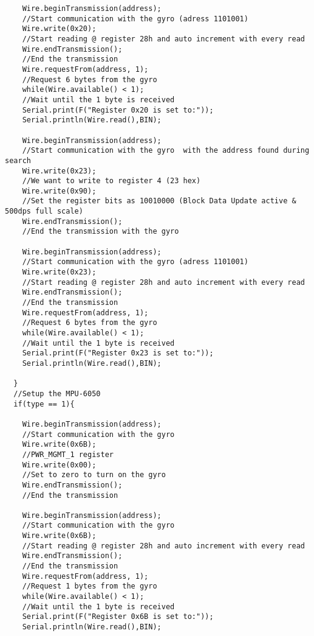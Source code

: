 \begin{lstlisting}
    Wire.beginTransmission(address);                             
    //Start communication with the gyro (adress 1101001)
    Wire.write(0x20);                                            
    //Start reading @ register 28h and auto increment with every read
    Wire.endTransmission();                                      
    //End the transmission
    Wire.requestFrom(address, 1);                                
    //Request 6 bytes from the gyro
    while(Wire.available() < 1);                                 
    //Wait until the 1 byte is received
    Serial.print(F("Register 0x20 is set to:"));
    Serial.println(Wire.read(),BIN);

    Wire.beginTransmission(address);                             
    //Start communication with the gyro  with the address found during search
    Wire.write(0x23);                                            
    //We want to write to register 4 (23 hex)
    Wire.write(0x90);                                            
    //Set the register bits as 10010000 (Block Data Update active & 500dps full scale)
    Wire.endTransmission();                                      
    //End the transmission with the gyro
    
    Wire.beginTransmission(address);                             
    //Start communication with the gyro (adress 1101001)
    Wire.write(0x23);                                            
    //Start reading @ register 28h and auto increment with every read
    Wire.endTransmission();                                      
    //End the transmission
    Wire.requestFrom(address, 1);                               
    //Request 6 bytes from the gyro
    while(Wire.available() < 1);                                 
    //Wait until the 1 byte is received
    Serial.print(F("Register 0x23 is set to:"));
    Serial.println(Wire.read(),BIN);

  }
  //Setup the MPU-6050
  if(type == 1){
    
    Wire.beginTransmission(address);                             
    //Start communication with the gyro
    Wire.write(0x6B);                                            
    //PWR_MGMT_1 register
    Wire.write(0x00);                                            
    //Set to zero to turn on the gyro
    Wire.endTransmission();                                      
    //End the transmission
    
    Wire.beginTransmission(address);                             
    //Start communication with the gyro
    Wire.write(0x6B);                                            
    //Start reading @ register 28h and auto increment with every read
    Wire.endTransmission();                                      
    //End the transmission
    Wire.requestFrom(address, 1);                                
    //Request 1 bytes from the gyro
    while(Wire.available() < 1);                                 
    //Wait until the 1 byte is received
    Serial.print(F("Register 0x6B is set to:"));
    Serial.println(Wire.read(),BIN);
    

\end{lstlisting}

